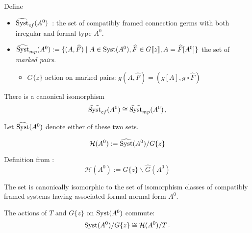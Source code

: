 \begin{defn}
  Define
  \begin{itemize}
    \item $\widehat{\operatorname{Syst}}_{cf}(A^0)$~:\Leftrightarrow{} the set of compatibly
      framed connection germs with both irregular and formal type $A^0$.
    \item $\widehat{\operatorname{Syst}}_{mp}(A^0):=\{(A,\widehat{F})\mid A\in\operatorname{Syst}(A^0)
      ,\widehat{F}\in G\llbracket z\rrbracket
      ,A=\widehat{F}[A^0]\}$
      the set of \emph{marked pairs}.
      \begin{itemize}
        \item $G\{z\}$ action on marked pairs:
          $g(A,\hat{F})=(g[A],g\circ\hat{F})$
      \end{itemize}
  \end{itemize}

  \begin{lem}
    There is a canonical isomorphism
    \[
      \widehat{\operatorname{Syst}}_{cf}(A^0)\cong\widehat{\operatorname{Syst}}_{mp}(A^0) \,,
    \]
  \end{lem}
  Let $\widehat{\operatorname{Syst}}(A^0)$ denote either of these two sets.
\end{defn}
\begin{paracol}{2}\sloppy %
  \begin{defn}
    \[
      \mathcal{H}(A^0):=\widehat{\operatorname{Syst}}(A^0)/G\{z\}
    \]
  \end{defn}
\switchcolumn %
  \begin{defn} Definition from \cite{thboalch}:
    \[
      \mathcal{H}(A^0):=G\{z\}\backslash\hat G(A^0)
    \]
  \end{defn}
  \begin{lem}
    The set is canonically isomorphic to the set of isomorphism classes of
    compatibly framed systems having associated formal normal form $A^0$.
  \end{lem}
\end{paracol} %
\begin{lem}
The actions of $T$ and $G\{z\}$ on $\operatorname{Syst}(A^0)$ commute:
\[
  \operatorname{Syst}(A^0)/G\{z\}\cong\mathcal{H}(A^0)/T \,.
\]
\end{lem}

